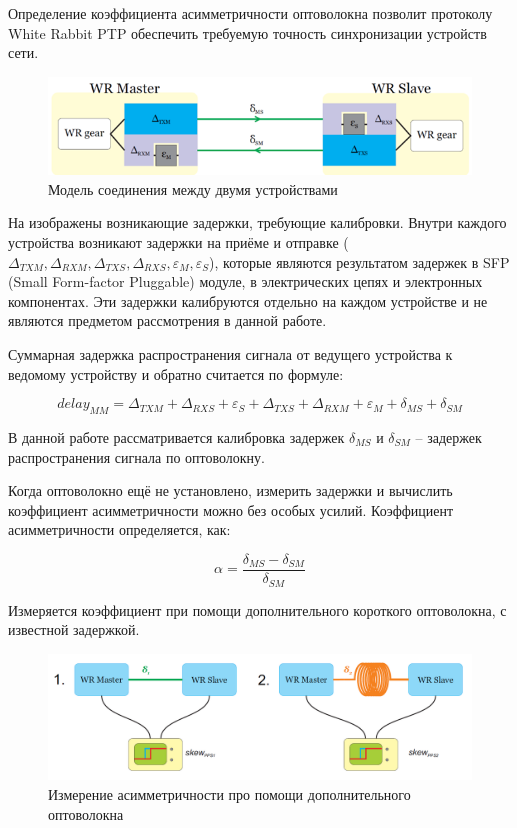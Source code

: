 Определение коэффициента асимметричности оптоволокна позволит протоколу White Rabbit PTP обеспечить требуемую точность синхронизации устройств сети.

\begin{figure}[ht!] 
	\center
	\includegraphics  {my_folder/images//conn_model}
	\caption{Модель соединения между двумя устройствами} 
	\label{fig:conn-model}  
\end{figure}

На  изображены возникающие задержки, требующие калибровки. Внутри каждого устройства 
возникают задержки на приёме и отправке ($\Delta_{TXM},\Delta_{RXM},\Delta_{TXS},\Delta_{RXS}, \varepsilon_{M},\varepsilon_{S}$),
которые являются результатом задержек в SFP (Small Form-factor Pluggable) 
модуле, в электрических цепях и электронных компонентах. Эти задержки калибруются отдельно на каждом устройстве и не являются
предметом рассмотрения в данной работе.

Суммарная задержка распространения сигнала от ведущего устройства к ведомому устройству и обратно считается по формуле:

\begin{equation}
delay_{MM} = \Delta_{TXM} + \Delta_{RXS} + \varepsilon_{S} + \Delta_{TXS} + \Delta_{RXM} + \varepsilon_{M} + \delta_{MS} + \delta_{SM}
\end{equation}

В данной работе рассматривается калибровка задержек $\delta_{MS}$ и $\delta_{SM}$ – задержек распространения сигнала по оптоволокну.

Когда оптоволокно ещё не установлено, измерить задержки и вычислить коэффициент асимметричности можно без особых усилий.
Коэффициент асимметричности определяется, как:

\begin{equation}
	\alpha = \frac{\delta_{MS} - \delta_{SM}}{\delta_{SM}}
\end{equation}

Измеряется коэффициент при помощи дополнительного короткого оптоволокна, с известной задержкой.

\begin{figure}[ht!] 
	\center
	\includegraphics [scale=0.4] {my_folder/images//meas_scheme_1}
	\caption{Измерение асимметричности про помощи дополнительного оптоволокна} 
	\label{fig:meas-scheme-1}  
\end{figure}

